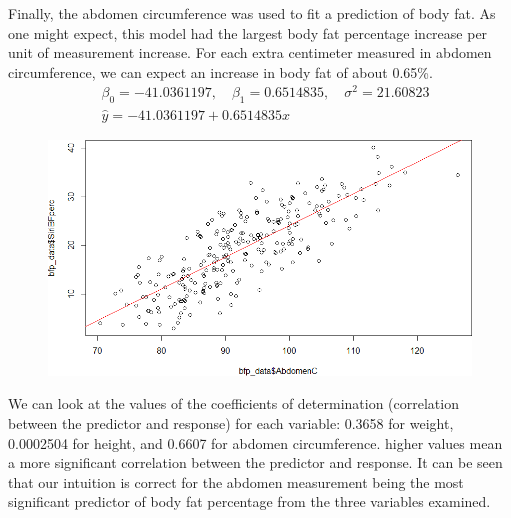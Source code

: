 \documentclass[a4paper, 11pt]{article}
\begin{document}
Finally, the abdomen circumference was used to fit a prediction of body fat. As one might expect, this model had the largest body fat percentage increase per unit of measurement increase. For each extra centimeter measured in abdomen circumference, we can expect an increase in body fat of about 0.65\%.
\begin{align*}
	&\beta_0 = -41.0361197 ,\quad \beta_1 = 0.6514835 ,\quad \sigma^2 =  21.60823 \\
	&\hat{y} = -41.0361197 + 0.6514835 x
\end{align*}
\begin{figure}[H]
	\centering
	\includegraphics[scale=0.65]{abdomen_plot.png}
\end{figure}

We can look at the values of the coefficients of determination (correlation between the predictor and response) for each variable: 0.3658 for weight, 0.0002504 for height, and 0.6607 for abdomen circumference. higher values mean a more significant correlation between the predictor and response. It can be seen that our intuition is correct for the abdomen measurement being the most significant predictor of body fat percentage from the three variables examined.
\end{document}
